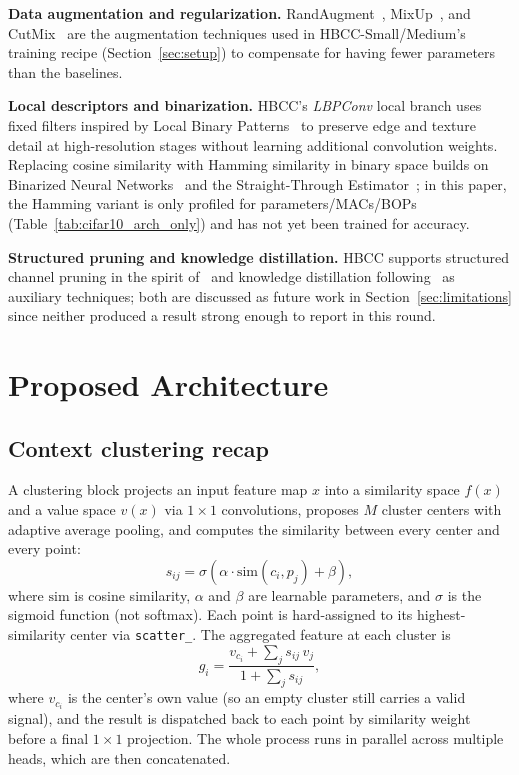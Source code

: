 \documentclass[journal]{IEEEtran}
\begin{document}
\textbf{Data augmentation and regularization.} RandAugment~\cite{Cubuk2020RandAugment}, MixUp~\cite{Zhang2018Mixup}, and CutMix~\cite{Yun2019CutMix} are the augmentation techniques used in HBCC-Small/Medium's training recipe (Section~\ref{sec:setup}) to compensate for having fewer parameters than the baselines.

\textbf{Local descriptors and binarization.} HBCC's \textit{LBPConv} local branch uses fixed filters inspired by Local Binary Patterns~\cite{Ojala2002LBP} to preserve edge and texture detail at high-resolution stages without learning additional convolution weights. Replacing cosine similarity with Hamming similarity in binary space builds on Binarized Neural Networks~\cite{Courbariaux2016BNN} and the Straight-Through Estimator~\cite{Bengio2013STE}; in this paper, the Hamming variant is only profiled for parameters/MACs/BOPs (Table~\ref{tab:cifar10_arch_only}) and has not yet been trained for accuracy.

\textbf{Structured pruning and knowledge distillation.} HBCC supports structured channel pruning in the spirit of~\cite{Li2017PruningFilters} and knowledge distillation following~\cite{Hinton2015Distillation} as auxiliary techniques; both are discussed as future work in Section~\ref{sec:limitations} since neither produced a result strong enough to report in this round.

\section{Proposed Architecture}
\label{sec:method}

\subsection{Context clustering recap}

A clustering block projects an input feature map $x$ into a similarity space $f(x)$ and a value space $v(x)$ via $1\times1$ convolutions, proposes $M$ cluster centers with adaptive average pooling, and computes the similarity between every center and every point:
\begin{equation}
s_{ij} = \sigma\left(\alpha \cdot \mathrm{sim}(c_i, p_j) + \beta\right),
\end{equation}
where $\mathrm{sim}$ is cosine similarity, $\alpha$ and $\beta$ are learnable parameters, and $\sigma$ is the sigmoid function (not softmax). Each point is hard-assigned to its highest-similarity center via \texttt{scatter\_}. The aggregated feature at each cluster is
\begin{equation}
g_i = \frac{v_{c_i} + \sum_{j} s_{ij}\, v_j}{1 + \sum_{j} s_{ij}},
\end{equation}
where $v_{c_i}$ is the center's own value (so an empty cluster still carries a valid signal), and the result is dispatched back to each point by similarity weight before a final $1\times1$ projection. The whole process runs in parallel across multiple heads, which are then concatenated.
\end{document}
